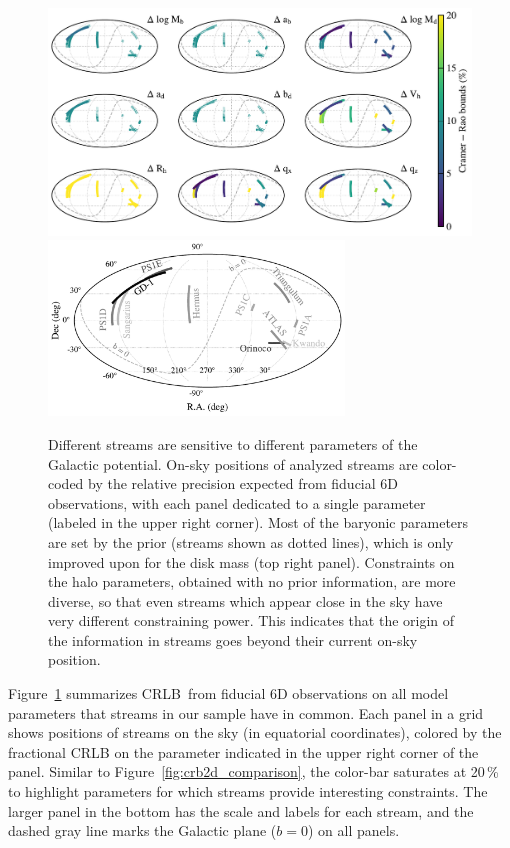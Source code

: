 \documentclass[modern]{aastex61}
\newcommand{\acronym}[1]{{\small{#1}}}
\newcommand{\CRLB}{\acronym{CRLB}}
\begin{document}
\begin{figure}
\begin{center}
\includegraphics[width=\textwidth]{crb_onsky_gal0.pdf}
\includegraphics[width=0.7\textwidth]{sky_legend_gal0.pdf}
\caption{Different streams are sensitive to different parameters of the Galactic potential.
On-sky positions of analyzed streams are color-coded by the relative precision expected from fiducial 6D observations, with each panel dedicated to a single parameter (labeled in the upper right corner).
Most of the baryonic parameters are set by the prior (streams shown as dotted lines), which is only improved upon for the disk mass (top right panel).
Constraints on the halo parameters, obtained with no prior information, are more diverse, so that even streams which appear close in the sky have very different constraining power.
This indicates that the origin of the information in streams goes beyond their current on-sky position.
}
\label{fig:sky_precision}
\end{center}
\end{figure}

Figure~\ref{fig:sky_precision} summarizes \CRLB\ from fiducial 6D observations on all model parameters that streams in our sample have in common.
Each panel in a grid shows positions of streams on the sky (in equatorial coordinates), colored by the fractional CRLB on the parameter indicated in the upper right corner of the panel.
Similar to Figure~\ref{fig:crb2d_comparison}, the color-bar saturates at 20\,\% to highlight parameters for which streams provide interesting constraints.
The larger panel in the bottom has the scale and labels for each stream, and the dashed gray line marks the Galactic plane ($b=0$) on all panels.
\end{document}
